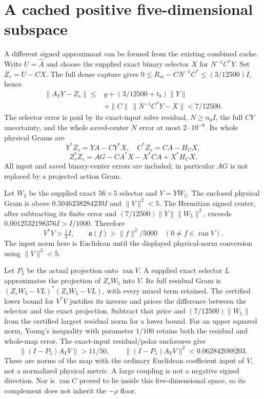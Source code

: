 \documentclass[11pt]{article}
\newcommand{\Ran}{\operatorname{ran}}
\numberwithin{equation}{section}
\begin{document}
\section{A cached positive five-dimensional subspace}\label{signedcache}
A different signed approximant can be formed from the existing combined
cache. Write $U=\widehat A$ and choose the supplied exact binary selector
$X$ for $N^{-1}C^*Y$. Set $Z_s=U-CX$. The full dense capture gives
$0\le R_m-CN^{-1}C^*\le(3/12500)I$, hence
\begin{align*}
 \|A_YY-Z_s\|\le{}&g+
       (3/12500+t_8)\|Y\|\\
 &+\|C\|\,\|N^{-1}C^*Y-X\|<7/12500.
\end{align*}
The selector error is paid by its exact-input solve residual,
$N\ge n_0I$, the full $CY$ uncertainty, and the whole saved-center
$N$ error at most $2\cdot10^{-8}$. Its whole physical Grams are
\[
 Y^*Z_s=YA-CY^*X,\quad C^*Z_s=CA-H_CX,
\]
\[
 Z_s^*Z_s=AG-CA^*X-X^*CA+X^*H_CX.
\]
All input and saved binary-center errors are included; in particular
$AG$ is not replaced by a projected action Gram.

Let $W_5$ be the supplied exact $56\times5$ selector and $V=YW_5$.
The enclosed physical Gram is above $0.5046238284239I$ and
$\|V\|^2<5$. The Hermitian signed center, after subtracting its
finite error and $(7/12500)\|Y\|\|W_5\|^2$, exceeds
$0.0012532198376I>I/1000$. Therefore
\begin{equation}\label{fivepos}
 V^*V>\tfrac12I,\qquad
 \mathfrak a(f)>\|f\|^2/5000\quad(0\ne f\in\Ran V).
\end{equation}
The input norm here is Euclidean until the displayed physical-norm
conversion using $\|V\|^2<5$.

Let $P_5$ be the actual projection onto $\Ran V$. A supplied exact
selector $L$ approximates the projection of $Z_sW_5$ into $V$.
Its full residual Gram is
$(Z_sW_5-VL)^*(Z_sW_5-VL)$, with every mixed term retained.
The certified lower bound for $V^*V$ justifies its inverse and prices
the difference between the selector and the exact projection.
Subtract that price and $(7/12500)\|W_5\|$ from the certified largest
residual norm for a lower bound. For an upper squared norm, Young's
inequality with parameter $1/100$ retains both the residual and
whole-map error. The exact-input residual/polar enclosures give
\begin{equation}\label{fivecoupling}
 \|(I-P_5)A_YV\|>11/50,\qquad
 \|(I-P_5)A_YV\|^2<0.062842088203.
\end{equation}
These are norms of the map with the ordinary Euclidean coefficient
input of $V$, not a normalized physical metric. A large coupling
is not a negative signed direction. Nor is $\Ran C$ proved to lie
inside this five-dimensional space, so its complement does not
inherit the $-\rho$ floor.
\end{document}
